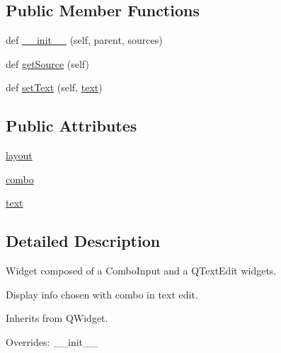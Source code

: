 \subsection*{Public Member Functions}
\begin{DoxyCompactItemize}
\item 
def \mbox{\hyperlink{classwindshape_1_1gui_1_1widgets_1_1tabs_1_1_info_widget_1_1_info_widget_a595fa980be3825ddd6363dd9e48bbe83}{\+\_\+\+\_\+init\+\_\+\+\_\+}} (self, parent, sources)
\item 
def \mbox{\hyperlink{classwindshape_1_1gui_1_1widgets_1_1tabs_1_1_info_widget_1_1_info_widget_a2d9f1f1f3c7ebbbf6ca62c996578b4ad}{get\+Source}} (self)
\item 
def \mbox{\hyperlink{classwindshape_1_1gui_1_1widgets_1_1tabs_1_1_info_widget_1_1_info_widget_ab81ead09bdf6f0b450f8b435038113bd}{set\+Text}} (self, \mbox{\hyperlink{classwindshape_1_1gui_1_1widgets_1_1tabs_1_1_info_widget_1_1_info_widget_a4ca2a7ad350569462848cc06ff2db7f6}{text}})
\end{DoxyCompactItemize}
\subsection*{Public Attributes}
\begin{DoxyCompactItemize}
\item 
\mbox{\hyperlink{classwindshape_1_1gui_1_1widgets_1_1tabs_1_1_info_widget_1_1_info_widget_a9fb732ab2c3d76d3730c641ed36f2158}{layout}}
\item 
\mbox{\hyperlink{classwindshape_1_1gui_1_1widgets_1_1tabs_1_1_info_widget_1_1_info_widget_a4ded9675427846a19fd0b48a860b80f7}{combo}}
\item 
\mbox{\hyperlink{classwindshape_1_1gui_1_1widgets_1_1tabs_1_1_info_widget_1_1_info_widget_a4ca2a7ad350569462848cc06ff2db7f6}{text}}
\end{DoxyCompactItemize}


\subsection{Detailed Description}
\begin{DoxyVerb}Widget composed of a ComboInput and a QTextEdit widgets.

Display info chosen with combo in text edit.

Inherits from QWidget.

Overrides: __init__
\end{DoxyVerb}
 

